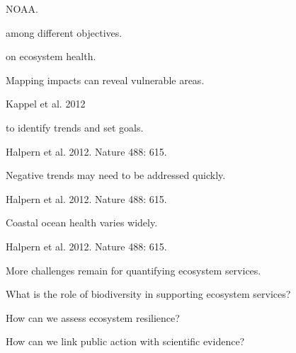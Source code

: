 \documentclass[t]{beamer}
\begin{document}

{
\begin{frame}[b]
\hfill\tiny NOAA.
\end{frame}
}



{
\begin{frame}[t]{ among different objectives.}
\end{frame}
}

{
\begin{frame}[t]{ on ecosystem health.}
\end{frame}
}

{
\begin{frame}[b]{Mapping impacts can reveal vulnerable areas.}

\tiny\hfill Kappel et al. 2012
\end{frame}
}

{
\begin{frame}[b]{ to identify trends and set goals.}

\tiny\hfill Halpern et al. 2012. Nature 488: 615.
\end{frame}
}

{
\begin{frame}[b]{Negative trends may need to be addressed quickly.}

\tiny\hfill Halpern et al. 2012. Nature 488: 615.
\end{frame}
}

{
\begin{frame}[b]{Coastal ocean health varies widely.}

\tiny\hfill Halpern et al. 2012. Nature 488: 615.
\end{frame}
}


\begin{frame}[t]{More challenges remain for quantifying ecosystem services.}

\hangpara What is the role of biodiversity in supporting ecosystem services?

\hangpara How can we assess ecosystem resilience?

\hangpara How can we link public action with scientific evidence?

\end{frame}
\end{document}
